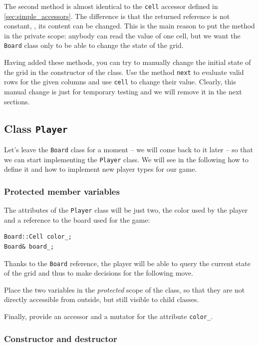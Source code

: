 \documentclass{article}
\begin{document}
The second method is almost identical to the \texttt{cell} accessor defined in \cref{sec:simple_accessors}. The difference is that the returned reference is not constant, \ie, its content can be changed. This is the main reason to put the method in the private scope: anybody can read the value of one cell, but we want the \texttt{Board} class only to be able to change the state of the grid.

Having added these methods, you can try to manually change the initial state of the grid in the constructor of the class. Use the method \texttt{next} to evaluate valid rows for the given columns and use \texttt{cell} to change their value. Clearly, this manual change is just for temporary testing and we will remove it in the next sections.




\subsection{Class \texttt{Player}}

Let's leave the \texttt{Board} class for a moment -- we will come back to it later -- so that we can start implementing the \texttt{Player} class. We will see in the following how to define it and how to implement new player types for our game.


\subsubsection{Protected member variables}

The attributes of the \texttt{Player} class will be just two, the color used by the player and a reference to the board used for the game:
\begin{lstlisting}[style=mycpp,numbers=none]
Board::Cell color_;
Board& board_;
\end{lstlisting}
Thanks to the \texttt{Board} reference, the player will be able to query the current state of the grid and thus to make decisions for the following move.

Place the two variables in the \emph{protected} scope of the class, so that they are not directly accessible from outside, but still visible to child classes.

Finally, provide an accessor and a mutator for the attribute \texttt{color\string_}.


\subsubsection{Constructor and destructor}
\end{document}
